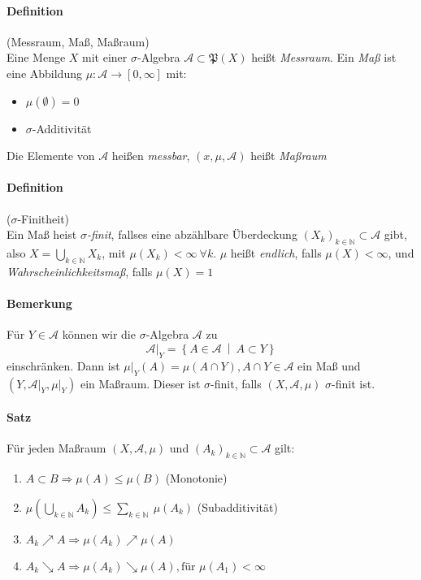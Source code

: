 \documentclass[12pt,a4paper,fleqn]{article}
\def\set#1{{\left\{ #1 \right\}}}
\def\Mid{\ \middle|\ }
\begin{document}
\paragraph{Definition}(Messraum, Maß, Maßraum)\\
Eine Menge $X$ mit einer $\sigma$-Algebra $\mathcal{A} \subset \mathfrak{P}(X)$ heißt \textit{Messraum}. Ein \textit{Maß} ist eine Abbildung $\mu\colon \mathcal{A} \rightarrow [0, \infty]$ mit:
\begin{itemize}
\item $\mu (\emptyset) = 0$
\item $\sigma$-Additivität
\end{itemize}
Die Elemente von $\mathcal{A}$ heißen \textit{messbar}, $(x, \mu, \mathcal{A})$ heißt \textit{Maßraum}

\paragraph{Definition}($\sigma$-Finitheit)\\
Ein Maß heist $\sigma$\textit{-finit}, fallses eine abzählbare Überdeckung $(X_k)_{k \in \mathbb{N}} \subset \mathcal{A}$ gibt, also $X = \bigcup_{k \in \mathbb{N}} X_k$, mit $\mu (X_k) < \infty\ \forall k$. $\mu$ heißt \textit{endlich}, falls $\mu (X) < \infty$, und \textit{Wahrscheinlichkeitsmaß}, falls $\mu (X) =1$

\paragraph{Bemerkung} Für $Y \in \mathcal{A}$ können wir die $\sigma$-Algebra $\mathcal{A}$ zu 
\begin{displaymath}
\mathcal{A}\vert_Y = \set{A \in \mathcal{A} \Mid A \subset Y}
\end{displaymath}
einschränken. Dann ist $\mu{\vert _Y} (A) = \mu (A\cap Y), A\cap Y \in \mathcal{A}$ ein Maß und $(Y, \mathcal{A}{\vert _Y}, \mu{\vert_Y})$ ein Maßraum.
Dieser ist $\sigma$-finit, falls $(X, \mathcal{A}, \mu)$ $\sigma$-finit ist.

\paragraph{Satz} Für jeden Maßraum $(X, \mathcal{A}, \mu)$ und $(A_k)_{k \in \mathbb{N}} \subset\mathcal{A}$ gilt:
\begin{enumerate}
\item$A \subset B \Rightarrow \mu (A) \leq \mu(B)$ (Monotonie)
\item$\mu(\bigcup_{k \in \mathbb{N}}A_k) \leq \sum_{k \in \mathbb{N}}\  \mu (A_k)$ (Subadditivität)
\item$A_k \nearrow A \Rightarrow \mu(A_k) \nearrow \mu(A)$
\item$A_k \searrow A \Rightarrow \mu(A_k) \searrow \mu(A), \text{für } \mu(A_1) <\infty$
\end{enumerate}
\end{document}
